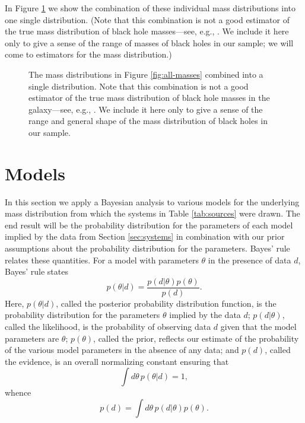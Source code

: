 \documentclass[preprint]{aastex}
\begin{document}
In Figure \ref{fig:masses} we show the combination of these individual
mass distributions into one single distribution.  (Note that this
combination is not a good estimator of the true mass distribution of
black hole masses---see, e.g., \citet{Mandel2010}.  We include it here
only to give a sense of the range of masses of black holes in our
sample; we will come to estimators for the mass distribution.)

\begin{figure}

  \caption{\label{fig:masses} The mass distributions in Figure
    \ref{fig:all-masses} combined into a single distribution. Note
    that this combination is not a good estimator of the true mass
    distribution of black hole masses in the galaxy---see, e.g.,
    \citet{Mandel2010}.  We include it here only to give a sense of
    the range and general shape of the mass distribution of black
    holes in our sample.}
\end{figure}

\section{Models}
\label{sec:models}

In this section we apply a Bayesian analysis to various models for the
underlying mass distribution from which the systems in Table
\ref{tab:sources} were drawn.  The end result will be the probability
distribution for the parameters of each model implied by the data from
Section \ref{sec:systems} in combination with our prior assumptions
about the probability distribution for the parameters.  Bayes' rule
relates these quantities.  For a model with parameters $\theta$ in the
presence of data $d$, Bayes' rule states
\begin{equation}
  \label{eq:Bayes-rule}
  p(\theta | d) = \frac{p(d | \theta) p(\theta)}{p(d)}.
\end{equation}
Here, $p(\theta|d)$, called the posterior probability distribution
function, is the probability distribution for the parameters $\theta$
implied by the data $d$; $p(d|\theta)$, called the likelihood, is the
probability of observing data $d$ given that the model parameters are
$\theta$; $p(\theta)$, called the prior, reflects our estimate of the
probability of the various model parameters in the absence of any
data; and $p(d)$, called the evidence, is an overall normalizing
constant ensuring that 
\begin{equation}
  \int d\theta\, p(\theta|d) = 1,
\end{equation}
whence
\begin{equation}
  \label{eq:evidence-def}
  p(d) = \int d\theta\, p(d|\theta) p(\theta).
\end{equation}
\end{document}
